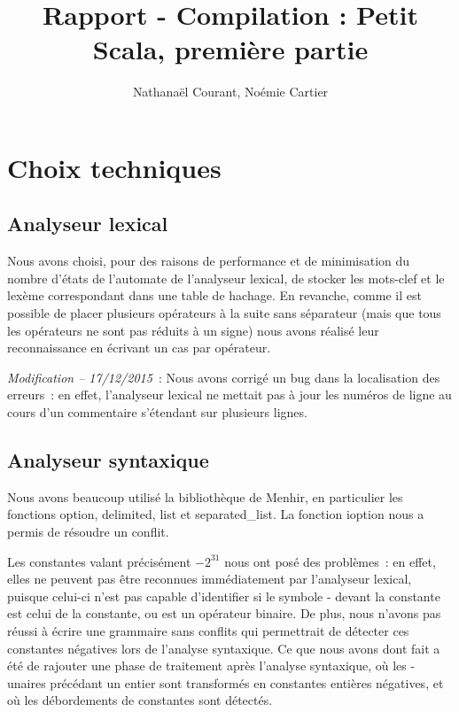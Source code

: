 \documentclass[a4paper,10pt]{article}
\title{Rapport - Compilation : Petit Scala, première partie}
\author{Nathanaël Courant, Noémie Cartier}
\newcommand{\code}[1]{{\fontfamily{pcr}\selectfont #1}}
\begin{document}
\maketitle

\section{Choix techniques}

\subsection{Analyseur lexical}

Nous avons choisi, pour des raisons de performance et de minimisation
du nombre d'états de l'automate de l'analyseur lexical, de stocker les
mots-clef et le lexème correspondant dans une table de hachage. En
revanche, comme il est possible de placer plusieurs opérateurs à la
suite sans séparateur (mais que tous les opérateurs ne sont pas
réduits à un signe) nous avons réalisé leur reconnaissance en écrivant
un cas par opérateur.

\textit{Modification -- 17/12/2015}~:
Nous avons corrigé un bug dans la localisation des erreurs~: en effet,
l'analyseur lexical ne mettait pas à jour les numéros de ligne au
cours d'un commentaire s'étendant sur plusieurs lignes.

\subsection{Analyseur syntaxique}


Nous avons beaucoup utilisé la bibliothèque de Menhir, 
en particulier les fonctions 
\code{option}, \code{delimited}, \code{list} et \code{separated\_{}list}. 
La fonction \code{ioption} nous a permis de résoudre un conflit.

Les constantes valant précisément $-2^{31}$ nous ont posé des
problèmes~: en effet, elles ne peuvent pas être reconnues
immédiatement par l'analyseur lexical, puisque celui-ci n'est pas
capable d'identifier si le symbole \code{-} devant la constante est
celui de la constante, ou est un opérateur binaire. De plus, nous
n'avons pas réussi à écrire une grammaire sans conflits
qui permettrait de détecter ces constantes négatives lors de l'analyse
syntaxique. Ce que nous avons dont fait a été de rajouter une phase de
traitement après l'analyse syntaxique, où les \code{-} unaires
précédant un entier sont transformés en constantes entières négatives,
et où les débordements de constantes sont détectés.
\end{document}
